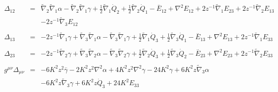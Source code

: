 \documentclass[10pt,letterpaper]{article}
\numberwithin{equation}{section}
\begin{document}
\begin{eqnarray}
\\  \nonumber\\ 
\Delta_{12}&=& \tilde{\nabla}_{2}\tilde{\nabla}_{1}\alpha -  \tilde{\nabla}_{2}\tilde{\nabla}_{1}\gamma +\tfrac{1}{2} \tilde{\nabla}_{1}\dot{Q}_{2} + \tfrac{1}{2} \tilde{\nabla}_{2}\dot{Q}_{1}- \overset{..}{E}_{12} + \nabla^{2}{}E_{12} + 2 z^{-1} \tilde{\nabla}_{1}E_{23} + 2 z^{-1} \tilde{\nabla}_{2}E_{13} \nonumber \\ 
&& - 2 z^{-1} \tilde{\nabla}_{3}E_{12}
\\  \nonumber\\ 
\Delta_{13}&=& -2 z^{-1} \tilde{\nabla}_{1}\gamma + \tilde{\nabla}_{3}\tilde{\nabla}_{1}\alpha -  \tilde{\nabla}_{3}\tilde{\nabla}_{1}\gamma +\tfrac{1}{2} \tilde{\nabla}_{1}\dot{Q}_{3} + \tfrac{1}{2} \tilde{\nabla}_{3}\dot{Q}_{1}- \overset{..}{E}_{13} + \nabla^{2}{}E_{13} + 2 z^{-1} \tilde{\nabla}_{1}E_{33}
\\  \nonumber\\ 
\Delta_{23}&=& -2 z^{-1} \tilde{\nabla}_{2}\gamma + \tilde{\nabla}_{3}\tilde{\nabla}_{2}\alpha -  \tilde{\nabla}_{3}\tilde{\nabla}_{2}\gamma +\tfrac{1}{2} \tilde{\nabla}_{2}\dot{Q}_{3} + \tfrac{1}{2} \tilde{\nabla}_{3}\dot{Q}_{2}- \overset{..}{E}_{23} + \nabla^{2}{}E_{23} + 2 z^{-1} \tilde{\nabla}_{2}E_{33}
\\  \nonumber\\ 
g^{\mu\nu}\Delta_{\mu\nu}&=& -6 K^2 z^2 \overset{..}{\gamma} - 2 K^2 z^2 \nabla^{2}{}\alpha + 4 K^2 z^2 \nabla^{2}{}\gamma - 24 K^2 \gamma + 6 K^2 z \tilde{\nabla}_{3}\alpha \nonumber \\ 
&& - 6 K^2 z \tilde{\nabla}_{3}\gamma +6 K^2 z \dot{Q}_{3}+24 K^2 E_{33}
\end{eqnarray}

%
\end{document}
